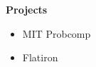 \noindent \textbf{\Huge Projects}\\[0.3cm]

\begin{itemize}
    \item MIT Probcomp
    \item Flatiron 
\end{itemize}